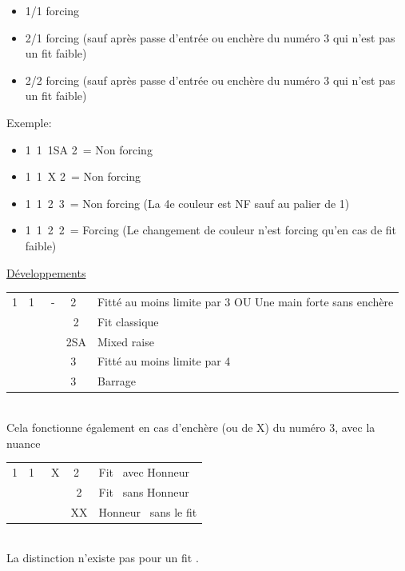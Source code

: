 \documentclass[a4paper, oneside, 11pt]{report}
\begin{document}
	\begin{itemize}
	\item 1/1 forcing
	\item 2/1 forcing (sauf après passe d'entrée ou enchère du numéro 3 qui n'est pas un fit faible)
	\item 2/2 forcing (sauf après passe d'entrée ou enchère du numéro 3 qui n'est pas un fit faible)\\
	\end{itemize}
	
	Exemple:
	\begin{itemize}
	\item 1\trefle\ 1\pique\ 1SA 2\carreau\ = Non forcing
	\item 1\trefle\ 1\pique\ X 2\carreau\ = Non forcing
	\item 1\trefle\ 1\pique\ 2\coeur\ 3\carreau\ = Non forcing (La 4e couleur est NF sauf au palier de 1)
	\item 1\trefle\ 1\pique\ 2\trefle\ 2\carreau\ = Forcing (Le changement de couleur n'est forcing qu'en cas de fit faible)\\
	\end{itemize}

	\underline{Développements}\\
	\begin{tabular}{cccc|l}
	1\carreau & 1\coeur\  & - & 2\carreau\ & Fitté au moins limite par 3 OU Une main forte sans enchère\\
	&&& 2\coeur & Fit classique\\
	&&& 2SA & Mixed raise\\
	&&& 3\carreau\ & Fitté au moins limite par 4\\
	&&& 3\coeur\ & Barrage\\
	\end{tabular}\\
	Cela fonctionne également en cas d'enchère (ou de X) du numéro 3, avec la nuance\\

	\begin{tabular}{cccc|l}
	1\carreau & 1\pique\  & X & 2\coeur\ & Fit \pique\ avec Honneur \pique\\
	&&& 2\pique & Fit \pique\ sans Honneur \pique\\
	&&& XX & Honneur \pique\ sans le fit\\
	\end{tabular}\\
	La distinction n'existe pas pour un fit \coeur.\\
\end{document}

